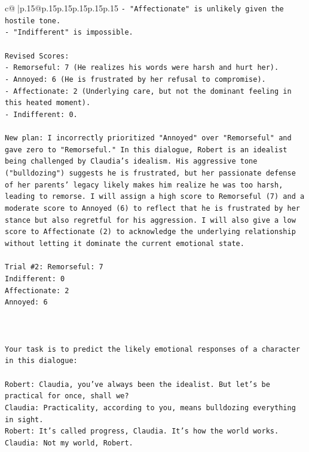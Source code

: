 \documentclass{article}
\begin{document}
{\begin{supertabular}{c@{$\;$}|p{.15\linewidth}@{}p{.15\linewidth}p{.15\linewidth}p{.15\linewidth}p{.15\linewidth}p{.15\linewidth}}
{{{\texttt{{-} "Affectionate" is unlikely given the hostile tone.} \\
\texttt{{-} "Indifferent" is impossible.} \\
\\ 
\texttt{Revised Scores:} \\
\texttt{{-} Remorseful: 7 (He realizes his words were harsh and hurt her).} \\
\texttt{{-} Annoyed: 6 (He is frustrated by her refusal to compromise).} \\
\texttt{{-} Affectionate: 2 (Underlying care, but not the dominant feeling in this heated moment).} \\
\texttt{{-} Indifferent: 0.} \\
\\ 
\texttt{New plan: I incorrectly prioritized "Annoyed" over "Remorseful" and gave zero to "Remorseful." In this dialogue, Robert is an idealist being challenged by Claudia's idealism. His aggressive tone ("bulldozing") suggests he is frustrated, but her passionate defense of her parents' legacy likely makes him realize he was too harsh, leading to remorse. I will assign a high score to Remorseful (7) and a moderate score to Annoyed (6) to reflect that he is frustrated by her stance but also regretful for his aggression. I will also give a low score to Affectionate (2) to acknowledge the underlying relationship without letting it dominate the current emotional state.} \\
\\ 
\texttt{Trial \#2: Remorseful: 7} \\
\texttt{Indifferent: 0} \\
\texttt{Affectionate: 2} \\
\texttt{Annoyed: 6} \\
\\ 
\\ 
\\ 
\texttt{Your task is to predict the likely emotional responses of a character in this dialogue:} \\
\\ 
\texttt{Robert: Claudia, you've always been the idealist. But let's be practical for once, shall we?} \\
\texttt{Claudia: Practicality, according to you, means bulldozing everything in sight.} \\
\texttt{Robert: It's called progress, Claudia. It's how the world works.} \\
\texttt{Claudia: Not my world, Robert.} \\
}}}
\end{supertabular}}
\end{document}
